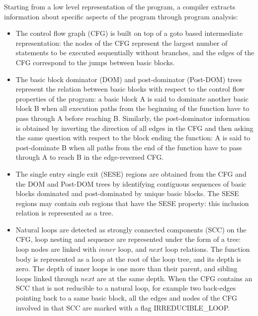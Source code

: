 \documentclass{sigplanconf}
\begin{document}
Starting from a low level representation of the program, a compiler extracts
information about specific aspects of the program through program analysis:

\begin{itemize}
\item The control flow graph (CFG) \cite{dragonbook} is built on top of a goto
  based intermediate representation: the nodes of the CFG represent the largest
  number of statements to be executed sequentially without branches, and the
  edges of the CFG correspond to the jumps between basic blocks.

\item The basic block dominator (DOM) and post-dominator (Post-DOM) trees
  \cite{dragonbook, ramalingam} represent the relation between basic blocks with respect to
  the control flow properties of the program: a basic block A is said to
  dominate another basic block B when all execution paths from the beginning of
  the function have to pass through A before reaching B.  Similarly, the
  post-dominator information is obtained by inverting the direction of all edges
  in the CFG and then asking the same question with respect to the block ending
  the function: A is said to post-dominate B when all paths from the end of the
  function have to pass through A to reach B in the edge-reversed CFG.

\item The single entry single exit (SESE) regions \cite{sese} are
  obtained from the CFG and the DOM and Post-DOM trees by identifying contiguous
  sequences of basic blocks dominated and post-dominated by unique basic blocks.
  The SESE regions may contain sub regions that have the SESE property: this
  inclusion relation is represented as a tree.

\label{subsec:loop-tree}
\item Natural loops \cite{dragonbook, ramalingam} are detected as strongly connected
  components (SCC) \cite{tarjan} on the CFG, loop nesting and sequence are
  represented under the form of a tree: loop nodes are linked with $inner$ loop,
  and $next$ loop relations.  The function body is represented as a loop at the
  root of the loop tree, and its depth is zero.  The depth of inner loops is one
  more than their parent, and sibling loops linked through $next$ are at the
  same depth.  When the CFG contains an SCC that is not reducible to a natural
  loop, for example two back-edges pointing back to a same basic block, all the
  edges and nodes of the CFG involved in that SCC are marked with a flag
  IRREDUCIBLE\_LOOP.


\end{itemize}
\end{document}
